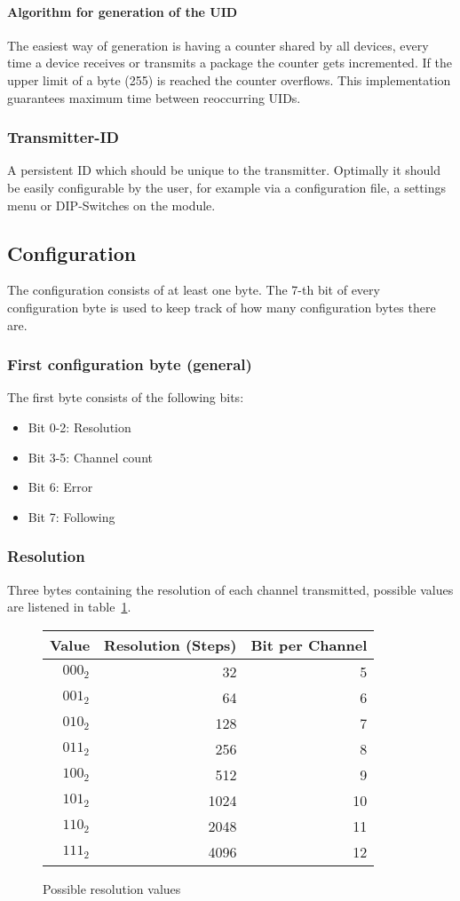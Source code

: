 \documentclass{scrreprt}
\begin{document}
\paragraph{Algorithm for generation of the UID}
 The easiest way of generation is having a counter shared by all devices,
 every time a device receives or transmits a package the counter gets
 incremented. If the upper limit of a byte (255) is reached the counter
 overflows. This implementation guarantees maximum time between reoccurring
 UIDs.

\subsubsection{Transmitter-ID}
 A persistent ID which should be unique to the transmitter. Optimally it
 should be easily configurable by the user, for example via a configuration
 file, a settings menu or DIP-Switches on the module.

\subsection{Configuration}
The configuration consists of at least one byte. The 7-th bit  of every configuration byte is used to keep track of how many configuration bytes there are.

\subsubsection{First configuration byte (general)}
The first byte consists of the following bits:
\begin{itemize}
 \item Bit 0-2: Resolution
 \item Bit 3-5: Channel count
 \item Bit 6: Error
 \item Bit 7: Following
\end{itemize}

\subsubsection{Resolution}
Three bytes containing the resolution of each channel transmitted, possible
values are listened in table~\ref{fig:resValues}.
\begin{figure}
   \centering
   \begin{tabular}{rrr}
     \toprule
     Value & Resolution (Steps) &	Bit per Channel \\
     \midrule
     $000_2$ & 32 & 5 \\
     $001_2$ & 64 & 6 \\
     $010_2$ & 128 & 7 \\
     $011_2$ & 256 & 8 \\
     $100_2$ & 512 & 9 \\
     $101_2$ & 1024 & 10 \\
     $110_2$ & 2048 & 11\\
     $111_2$ & 4096 & 12 \\
     \bottomrule
   \end{tabular}
   \caption{Possible resolution values}
   \label{fig:resValues}
\end{figure}
\end{document}
